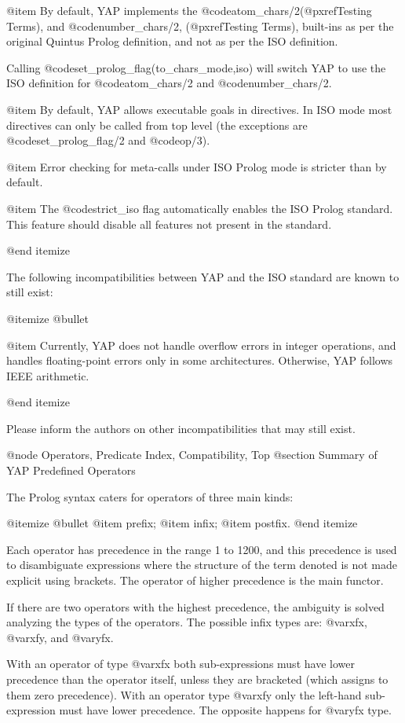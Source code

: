 @item By default, YAP implements the 
@code{atom_chars/2}(@pxref{Testing Terms}), and 
@code{number_chars/2}, (@pxref{Testing Terms}), 
built-ins as per the original Quintus Prolog definition, and
not as per the ISO definition.

Calling @code{set_prolog_flag(to_chars_mode,iso)} will switch
YAP to use the ISO definition for
@code{atom_chars/2} and @code{number_chars/2}.

@item By default, YAP allows executable goals in directives. In ISO mode
most directives can only be called from top level (the exceptions are
@code{set_prolog_flag/2} and @code{op/3}).

@item Error checking for meta-calls under ISO Prolog mode is stricter
than by default.

@item The @code{strict_iso} flag automatically enables the ISO Prolog
standard. This feature should disable all features not present in the
standard.

@end itemize

The following incompatibilities between YAP and the ISO standard are
known to still exist:

@itemize @bullet

@item Currently, YAP does not handle overflow errors in integer
operations, and handles floating-point errors only in some
architectures. Otherwise, YAP follows IEEE arithmetic.

@end itemize

Please inform the authors on other incompatibilities that may still
exist.

@node Operators, Predicate Index, Compatibility, Top
@section Summary of YAP Predefined Operators


 The Prolog syntax caters for operators of three main kinds:

@itemize @bullet
@item
prefix;
@item
infix;
@item
postfix.
@end itemize

 Each operator has precedence in the range 1 to 1200, and this 
precedence is used to disambiguate expressions where the structure of the 
term denoted is not made explicit using brackets. The operator of higher 
precedence is the main functor.

 If there are two operators with the highest precedence, the ambiguity 
is solved analyzing the types of the operators. The possible infix types are: 
@var{xfx}, @var{xfy}, and @var{yfx}.

 With an operator of type @var{xfx} both sub-expressions must have lower 
precedence than the operator itself, unless they are bracketed (which 
assigns to them zero precedence). With an operator type @var{xfy} only the  
left-hand sub-expression must have lower precedence. The opposite happens 
for @var{yfx} type.


